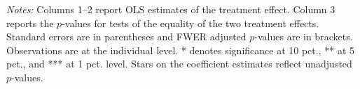 \begin{table}[h]
{\begin{threeparttable}
\begin{tabular}{l*{5}{c}}
\bottomrule \end{tabular} \begin{tablenotes}[flushleft] \footnotesize \item \emph{Notes:} Columns 1--2 report OLS estimates of the treatment effect. Column 3 reports the \(p\)-values for tests of the equality of the two treatment effects. Standard errors are in parentheses and FWER adjusted \(p\)-values are in brackets. Observations are at the individual level. * denotes significance at 10 pct., ** at 5 pct., and *** at 1 pct. level. Stars on the coefficient estimates reflect unadjusted \(p\)-values. \end{tablenotes} \end{threeparttable} } \end{table}

